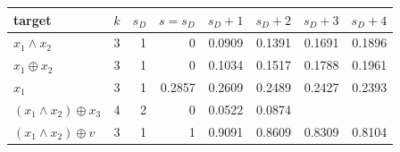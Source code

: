 \begin{tabular}{lrrrrrrr}
\toprule
target & $k$ & $s_D$ & $s=s_D$ & $s_D+1$ & $s_D+2$ & $s_D+3$ & $s_D+4$ \\
\midrule
$x_1\wedge x_2$ & 3 & 1 & 0 & 0.0909 & 0.1391 & 0.1691 & 0.1896 \\
$x_1\oplus x_2$ & 3 & 1 & 0 & 0.1034 & 0.1517 & 0.1788 & 0.1961 \\
$x_1$ & 3 & 1 & 0.2857 & 0.2609 & 0.2489 & 0.2427 & 0.2393 \\
$(x_1\wedge x_2)\oplus x_3$ & 4 & 2 & 0 & 0.0522 & 0.0874 &  &  \\
$(x_1\wedge x_2)\oplus v$ & 3 & 1 & 1 & 0.9091 & 0.8609 & 0.8309 & 0.8104 \\
\bottomrule
\end{tabular}
